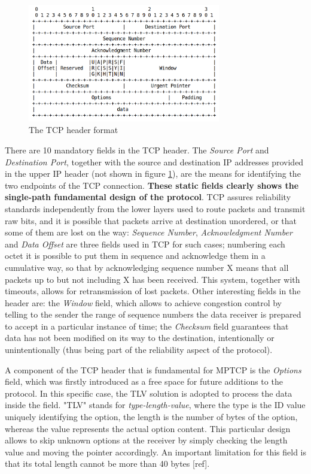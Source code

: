 \begin{figure}[!htb]
\centering
\includegraphics[width=0.75\textwidth]{images/tcp_header}
\caption{The TCP header format}
\label{fig:tcp_header}
\end{figure}

There are 10 mandatory fields in the TCP header.
The \textit{Source Port} and \textit{Destination Port}, together with the source and destination IP addresses provided in the upper IP header (not shown in figure \ref{fig:tcp_header}), are the means for identifying the two endpoints of the TCP connection. \textbf{These static fields clearly shows the single-path fundamental design of the protocol}. 
TCP assures reliability standards independently from the lower layers used to route packets and transmit raw bits, and it is possible that packets arrive at destination unordered, or that some of them are lost on the way: \textit{Sequence Number}, \textit{Acknowledgment Number} and \textit{Data Offset} are three fields used in TCP for such cases; numbering each octet it is possible to put them in sequence and acknowledge them in a cumulative way, so that by acknowledging sequence number X means that all packets up to but not including X has been received. This system, together with timeouts, allows for retransmission of lost packets.
Other interesting fields in the header are: the \textit{Window} field, which allows to achieve congestion control by telling to the sender the range of sequence numbers the data receiver is prepared to accept in a particular instance of time; the \textit{Checksum} field guarantees that data has not been modified on its way to the destination, intentionally or unintentionally (thus being part of the reliability aspect of the protocol).


A component of the TCP header that is fundamental for MPTCP is the \textit{Options} field, which was firstly introduced as a free space for future additions to the protocol. In this specific case, the TLV solution is adopted to process the data inside the field. "TLV" stands for \textit{type-length-value}, where the type is the ID value uniquely identifying the option, the length is the number of bytes of the option, whereas the value represents the actual option content. This particular design allows to skip unknown options at the receiver by simply checking the length value and moving the pointer accordingly. An important limitation for this field is that its total length cannot be more than 40 bytes [ref].

